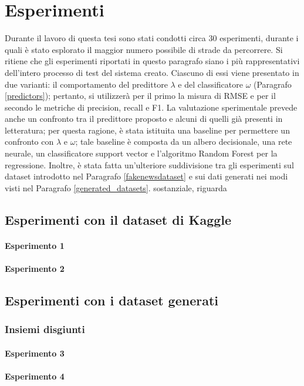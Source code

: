 \documentclass[12pt]{report}
\theoremstyle{definition}
\begin{document}
\section{Esperimenti}\label{esperimenti}
Durante il lavoro di questa tesi sono stati condotti circa 30 esperimenti, durante i quali è stato esplorato il maggior numero possibile di strade da percorrere. Si ritiene che gli esperimenti riportati in questo paragrafo siano i più rappresentativi dell'intero processo di test del sistema creato. Ciascuno di essi viene presentato in due varianti: il comportamento del predittore $\lambda$ e del classificatore $\omega$ (Paragrafo \ref{predictors}); pertanto, si utilizzerà per il primo la misura di RMSE e per il secondo le metriche di precision, recall e F1. La valutazione sperimentale prevede anche un confronto tra il predittore proposto e alcuni di quelli già presenti in letteratura; per questa ragione, è stata istituita una baseline per permettere un confronto con $\lambda$ e $\omega$; tale baseline è composta da un albero decisionale, una rete neurale, un classificatore support vector e l'algoritmo Random Forest per la regressione.
Inoltre, è stata fatta un'ulteriore suddivisione tra gli esperimenti sul dataset introdotto nel Paragrafo \ref{fakenewsdataset} e sui dati generati nei modi visti nel Paragrafo \ref{generated_datasets}.  sostanziale, riguarda 

\subsection{Esperimenti con il dataset di Kaggle}
\paragraph{Esperimento 1}
\paragraph{Esperimento 2}
\subsection{Esperimenti con i dataset generati}
\subsubsection{Insiemi disgiunti}
\paragraph{Esperimento 3}
\paragraph{Esperimento 4}
\end{document}
